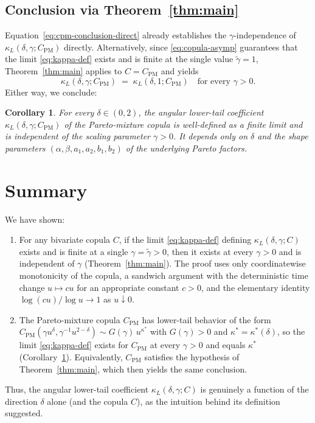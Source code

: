 \documentclass[11pt]{article}
\newtheorem{corollary}[theorem]{Corollary}
\theoremstyle{definition}
\newcommand{\PM}{\mathrm{PM}}
\begin{document}
\subsection{Conclusion via Theorem~\ref{thm:main}}

Equation~\eqref{eq:cpm-conclusion-direct} already establishes the
$\gamma$-independence of $\kappa_L(\delta,\gamma;C_{\PM})$ directly.
Alternatively, since \eqref{eq:copula-asymp} guarantees that the limit
\eqref{eq:kappa-def} exists and is finite at the single value
$\tilde\gamma=1$, Theorem~\ref{thm:main} applies to $C=C_{\PM}$ and
yields
\[
\kappa_L(\delta,\gamma;C_{\PM})
\;=\; \kappa_L(\delta,1;C_{\PM})
\quad \text{for every } \gamma>0.
\]
Either way, we conclude:

\begin{corollary}\label{cor:pm}
For every $\delta\in(0,2)$, the angular lower-tail coefficient
$\kappa_L(\delta,\gamma;C_{\PM})$ of the Pareto-mixture copula is
well-defined as a finite limit and is independent of the scaling
parameter $\gamma>0$. It depends only on $\delta$ and the shape
parameters $(\alpha,\beta,a_1,a_2,b_1,b_2)$ of the underlying Pareto
factors.
\end{corollary}

\section{Summary}

We have shown:
\begin{enumerate}[label=(\roman*),leftmargin=*]
\item For any bivariate copula $C$, if the limit
\eqref{eq:kappa-def} defining $\kappa_L(\delta,\gamma;C)$ exists and is
finite at a single $\gamma=\tilde\gamma>0$, then it exists at every
$\gamma>0$ and is independent of $\gamma$
(Theorem~\ref{thm:main}). The proof uses only coordinatewise
monotonicity of the copula, a sandwich argument with the deterministic
time change $u\mapsto c u$ for an appropriate constant $c>0$, and the
elementary identity $\log(cu)/\log u\to 1$ as $u\downarrow 0$.
\item The Pareto-mixture copula $C_{\PM}$ has lower-tail behavior of
the form $C_{\PM}(\gamma u^{\delta},\gamma^{-1}u^{2-\delta})\sim
G(\gamma)\,u^{\kappa^*}$ with $G(\gamma)>0$ and
$\kappa^*=\kappa^*(\delta)$, so the limit \eqref{eq:kappa-def} exists
for $C_{\PM}$ at every $\gamma>0$ and equals $\kappa^*$
(Corollary~\ref{cor:pm}). Equivalently, $C_{\PM}$ satisfies the
hypothesis of Theorem~\ref{thm:main}, which then yields the same
conclusion.
\end{enumerate}

Thus, the angular lower-tail coefficient $\kappa_L(\delta,\gamma;C)$ is
genuinely a function of the direction $\delta$ alone (and the copula
$C$), as the intuition behind its definition suggested.
\end{document}
